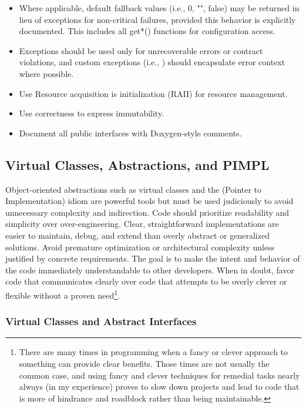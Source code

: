 \begin{itemize}
    \item Where applicable, default fallback values (i.e., 0, "", false) may be returned in lieu of exceptions for non-critical failures, provided this behavior is explicitly documented. This includes all get*() functions for configuration access.
    \item Exceptions should be used only for unrecoverable errors or contract violations, and custom exceptions (i.e., ) should encapsulate error context where possible.
    \item Use Resource acquisition is initialization (RAII) for resource management.
    \item Use  correctness to express immutability.
    \item Document all public interfaces with Doxygen-style comments.
\end{itemize}



\subsection{Virtual Classes, Abstractions, and PIMPL}

Object-oriented abstractions such as virtual classes and the  (Pointer to Implementation) idiom are powerful tools but must be used judiciously to avoid unnecessary complexity and indirection. Code should prioritize readability and simplicity over over-engineering. Clear, straightforward implementations are easier to maintain, debug, and extend than overly abstract or generalized solutions. Avoid premature optimization or architectural complexity unless justified by concrete requirements. The goal is to make the intent and behavior of the code immediately understandable to other developers. When in doubt, favor code that communicates clearly over code that attempts to be overly clever or flexible without a proven need\footnote{There are many times in programming when a fancy or clever approach to something can provide clear benefits. Those times are not usually the common case, and using fancy and clever techniques for remedial tasks nearly always (in my experience) proves to slow down projects and lead to code that is more of hindrance and roadblock rather than being maintainable.}.




\subsubsection*{Virtual Classes and Abstract Interfaces}

